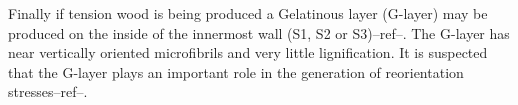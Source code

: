 Finally if tension wood is being produced a Gelatinous layer (G-layer)
may be produced on the inside of the innermost wall (S1, S2 or S3)--ref--. The
G-layer has near vertically oriented microfibrils and very little lignification.
It is suspected that the G-layer plays an important role in the generation of
reorientation stresses--ref--.
